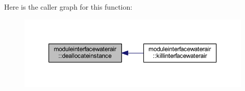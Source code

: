 Here is the caller graph for this function\+:\nopagebreak
\begin{figure}[H]
\begin{center}
\leavevmode
\includegraphics[width=350pt]{namespacemoduleinterfacewaterair_ab0b32961ac4c2950c8d474148dba7b1d_icgraph}
\end{center}
\end{figure}
\mbox{\label{namespacemoduleinterfacewaterair_ae6acdb7a76bd3e0edd25e31a74d3ab48}} 
